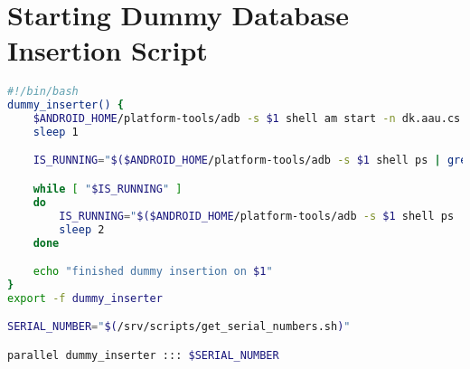 \chapter{Starting Dummy Database Insertion Script}\label{app:start_wait_db_inserter_parallel}
\begin{lstlisting}[language=bash,caption=Script that starts and waits for the dummy database insertion app in parallel on all connected devices,label=lst:start_wait_db_inserter_parallel]
#!/bin/bash
dummy_inserter() {
    $ANDROID_HOME/platform-tools/adb -s $1 shell am start -n dk.aau.cs.giraf.dummydbinserter/dk.aau.cs.giraf.dummydbinserter.MainActivity
    sleep 1

    IS_RUNNING="$($ANDROID_HOME/platform-tools/adb -s $1 shell ps | grep dk.aau.cs.giraf.dummydbinserter)"

    while [ "$IS_RUNNING" ]
    do
        IS_RUNNING="$($ANDROID_HOME/platform-tools/adb -s $1 shell ps | grep dk.aau.cs.giraf.dummydbinserter)"
        sleep 2
    done

    echo "finished dummy insertion on $1"
}
export -f dummy_inserter

SERIAL_NUMBER="$(/srv/scripts/get_serial_numbers.sh)"

parallel dummy_inserter ::: $SERIAL_NUMBER

\end{lstlisting}